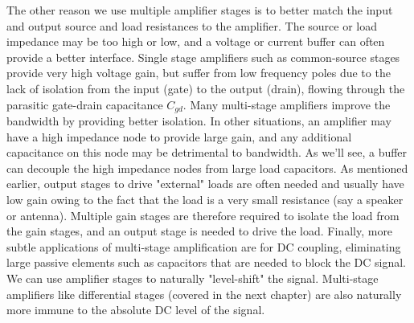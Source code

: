 The other reason we use multiple amplifier stages is to better match the input and output source and load resistances to the amplifier.  The source or load impedance may be too high or low, and a voltage or current buffer can often provide a better interface.  
Single stage amplifiers such as common-source stages provide very high voltage gain, but suffer from low frequency poles due to the lack of isolation from the input (gate) to the output (drain), flowing through the parasitic gate-drain capacitance $C_{gd}$.  Many multi-stage amplifiers improve the bandwidth by providing better isolation.  
In other situations, an amplifier may have a high impedance node to provide large gain, and any additional capacitance on this node may be detrimental to bandwidth.  As we'll see, a buffer can decouple the high impedance nodes from large load capacitors.  
As mentioned earlier, output stages to drive "external" loads are often needed and usually have low gain owing to the fact that the load is a very small resistance (say a speaker or antenna).  Multiple gain stages are therefore required to isolate the load from the gain stages, and an output stage is needed to drive the load.  
Finally, more subtle applications of multi-stage amplification are for DC coupling, eliminating large passive elements such as capacitors that are needed to block the DC signal.   We can use amplifier stages to naturally "level-shift" the signal.  Multi-stage amplifiers like differential stages (covered in the next chapter) are also naturally more immune to the absolute DC level of the signal.  
\section{\topicA}
